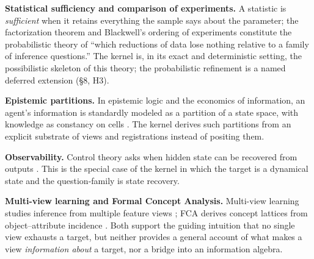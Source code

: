\textbf{Statistical sufficiency and comparison of experiments.} A statistic is \emph{sufficient} when it retains everything the sample says about the parameter; the factorization theorem \autocite{halmos1949} and Blackwell's ordering of experiments \autocite{blackwell1951,blackwell1953} constitute the probabilistic theory of ``which reductions of data lose nothing relative to a family of inference questions.'' The kernel is, in its exact and deterministic setting, the possibilistic skeleton of this theory; the probabilistic refinement is a named deferred extension (§8, H3).

\textbf{Epistemic partitions.} In epistemic logic and the economics of information, an agent's information is standardly modeled as a partition of a state space, with knowledge as constancy on cells \autocite{aumann1976}. The kernel derives such partitions from an explicit substrate of views and registrations instead of positing them.

\textbf{Observability.} Control theory asks when hidden state can be recovered from outputs \autocite{kalman1963,hermann1977}. This is the special case of the kernel in which the target is a dynamical state and the question-family is state recovery.

\textbf{Multi-view learning and Formal Concept Analysis.} Multi-view learning studies inference from multiple feature views \autocite{xu2013,zhao2017}; FCA derives concept lattices from object--attribute incidence \autocite{wille1982,ganter1999}. Both support the guiding intuition that no single view exhausts a target, but neither provides a general account of what makes a view \emph{information about} a target, nor a bridge into an information algebra.

